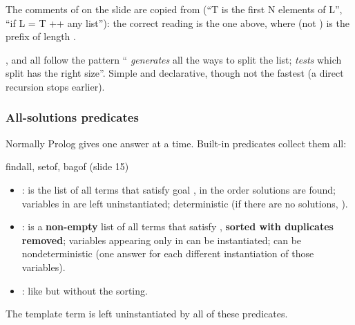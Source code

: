 \begin{nbwarning}
The comments of  on the slide are copied from  (``T is the first N
elements of L'', ``if L = T ++ any list''): the correct reading is the one above, where
 (not ) is the prefix of length .
\end{nbwarning}

\begin{nbintuition}
,  and  all follow the pattern ``
\emph{generates} all the ways to split the list;  \emph{tests} which split has
the right size''. Simple and declarative, though not the fastest (a direct recursion stops
earlier).
\end{nbintuition}

\subsubsection{All-solutions predicates}

Normally Prolog gives one answer at a time. Built-in predicates collect them all:

\begin{nbdef}{findall, setof, bagof (slide 15)}
\begin{itemize}[nosep]
  \item {}:  is the list of all terms  that satisfy goal
        , in the order solutions are found; variables in  are left
        uninstantiated; deterministic (if there are no solutions, ).
  \item {}:  is a \textbf{non-empty} list of all terms 
        that satisfy , \textbf{sorted with duplicates removed}; variables appearing
        only in  can be instantiated; can be nondeterministic (one answer for each
        different instantiation of those variables).
  \item {}: like  but without the sorting.
\end{itemize}
The template term  is left uninstantiated by all of these predicates.
\end{nbdef}

